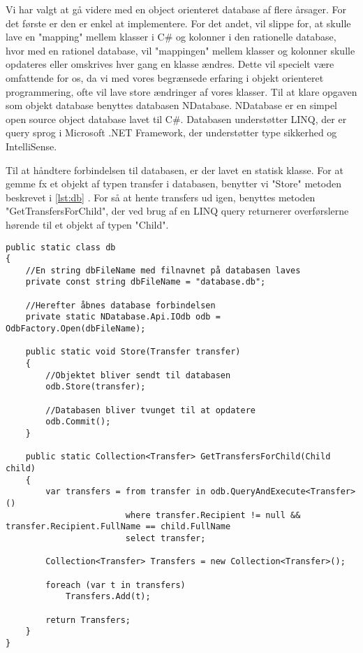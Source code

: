 Vi har valgt at gå videre med en object orienteret database af flere årsager. For det første er den er enkel at implementere. For det andet, vil slippe for, at skulle lave en "mapping" mellem klasser i C\# og kolonner i den rationelle database, hvor med en rationel database, vil "mappingen" mellem klasser og kolonner skulle opdateres eller omskrives hver gang en klasse ændres. Dette vil specielt være omfattende for os, da vi med vores begrænsede erfaring i objekt orienteret programmering, ofte vil lave store ændringer af vores klasser.
Til at klare opgaven som objekt database benyttes databasen NDatabase. NDatabase er en simpel open source object database lavet til C\#. Databasen understøtter LINQ, der er query sprog i Microsoft .NET Framework, der understøtter type sikkerhed og IntelliSense.  %

Til at håndtere forbindelsen til databasen, er der lavet en statisk klasse. For at gemme fx et objekt af typen transfer i databasen, benytter vi "Store" metoden beskrevet i \ref{lst:db} . For så at hente transfers ud igen, benyttes metoden "GetTransfersForChild", der ved brug af en LINQ query returnerer overførslerne hørende til et objekt af typen "Child".

\begin{lstlisting}[caption={Uddrag af filen db.cs fra kildekoden til programmet},label={lst:db}]
public static class db
{
	//En string dbFileName med filnavnet på databasen laves
	private const string dbFileName = "database.db";
	
	//Herefter åbnes database forbindelsen
	private static NDatabase.Api.IOdb odb = OdbFactory.Open(dbFileName);

	public static void Store(Transfer transfer)
	{
		//Objektet bliver sendt til databasen
		odb.Store(transfer);
		
		//Databasen bliver tvunget til at opdatere
		odb.Commit();
	}
	
	public static Collection<Transfer> GetTransfersForChild(Child child)
	{
		var transfers = from transfer in odb.QueryAndExecute<Transfer>()
						where transfer.Recipient != null && transfer.Recipient.FullName == child.FullName
						select transfer;

		Collection<Transfer> Transfers = new Collection<Transfer>();

		foreach (var t in transfers)
			Transfers.Add(t);

		return Transfers;
	}
}
\end{lstlisting}
